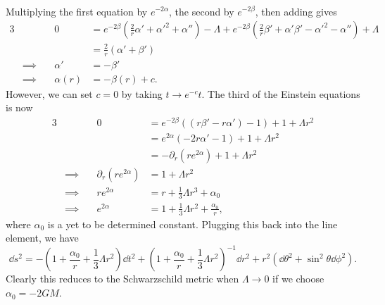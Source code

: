 \documentclass[12pt]{article}
\begin{document}
\begin{enumerate}[label=(\alph*)]
\begin{align*}
    \end{align*}
    Multiplying the first equation by $e^{-2\alpha}$, the second by $e^{-2\beta}$, then adding gives
    \begin{alignat*}{3}
        &\quad & 0 &= e^{-2\beta}\left(\frac{2}{r}\alpha' + \alpha'^2 + \alpha''\right) - \Lambda + e^{-2\beta}\left(\frac{2}{r}\beta' + \alpha'\beta' -  \alpha'^2 - \alpha''\right) + \Lambda \\
        &\quad &   &= \frac{2}{r}\left(\alpha' + \beta'\right) \\
        &\implies\quad & \alpha' &= -\beta' \\
        &\implies\quad & \alpha(r) &= -\beta(r) + c.
    \end{alignat*}
    However, we can set $c = 0$ by taking $t \to e^{-c}t$. The third of the Einstein equations is now
    \begin{alignat*}{3}
        &\quad & 0 &= e^{-2\beta}\left(\left(r\beta' - r\alpha'\right) -1\right) + 1 + \Lambda r^2 \\
        &\quad &   &= e^{2\alpha}\left(-2r\alpha' - 1\right) + 1 + \Lambda r^2 \\
        &\quad &   &= -\partial_r\left(re^{2\alpha}\right) + 1 + \Lambda r^2 \\
        &\implies\quad & \partial_r\left(re^{2\alpha}\right) &= 1 + \Lambda r^2 \\
        &\implies\quad & re^{2\alpha} &= r + \frac{1}{3}\Lambda r^3 + \alpha_0 \\
        &\implies\quad & e^{2\alpha} &= 1 + \frac{1}{3}\Lambda r^2 + \frac{\alpha_0}{r},
    \end{alignat*}
    where $\alpha_0$ is a yet to be determined constant. Plugging this back into the line element, we have
    \[ \dd s^2 = -\left(1 + \frac{\alpha_0}{r} + \frac{1}{3}\Lambda r^2\right)\dd t^2 + \left(1 + \frac{\alpha_0}{r} + \frac{1}{3}\Lambda r^2\right)^{-1}\dd r^2 + r^2\left(\dd\theta^2 + \sin^2\theta\dd\phi^2\right). \]
    Clearly this reduces to the Schwarzschild metric when $\Lambda\to 0$ if we choose $\alpha_0 = -2GM$.


\end{enumerate}
\end{document}
